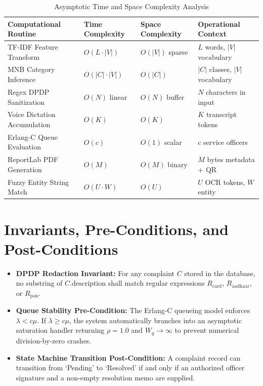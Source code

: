 \begin{table}[h]
\centering
\caption{Asymptotic Time and Space Complexity Analysis}
\label{tab:complexity_analysis}
\begin{tabular}{|p{4.5cm}|p{3.0cm}|p{3.0cm}|p{4.0cm}|}
\hline
\textbf{Computational Routine} & \textbf{Time Complexity} & \textbf{Space Complexity} & \textbf{Operational Context} \\ \hline
TF-IDF Feature Transform & $O(L \cdot |V|)$ & $O(|V|)$ sparse & $L$ words, $|V|$ vocabulary \\ \hline
MNB Category Inference & $O(|C| \cdot |V|)$ & $O(|C|)$ & $|C|$ classes, $|V|$ vocabulary \\ \hline
Regex DPDP Sanitization & $O(N)$ linear & $O(N)$ buffer & $N$ characters in input \\ \hline
Voice Dictation Accumulation & $O(K)$ & $O(K)$ & $K$ transcript tokens \\ \hline
Erlang-C Queue Evaluation & $O(c)$ & $O(1)$ scalar & $c$ service officers \\ \hline
ReportLab PDF Generation & $O(M)$ & $O(M)$ binary & $M$ bytes metadata + QR \\ \hline
Fuzzy Entity String Match & $O(U \cdot W)$ & $O(U)$ & $U$ OCR tokens, $W$ entity \\ \hline
\end{tabular}
\end{table}

\section{Invariants, Pre-Conditions, and Post-Conditions}
\begin{itemize}
    \item \textbf{DPDP Redaction Invariant:} For any complaint $C$ stored in the database, no substring of $C.\text{description}$ shall match regular expressions $R_{\text{card}}$, $R_{\text{aadhaar}}$, or $R_{\text{pan}}$.
    \item \textbf{Queue Stability Pre-Condition:} The Erlang-C queueing model enforces $\lambda < c\mu$. If $\lambda \ge c\mu$, the system automatically branches into an asymptotic saturation handler returning $\rho = 1.0$ and $W_q \rightarrow \infty$ to prevent numerical division-by-zero crashes.
    \item \textbf{State Machine Transition Post-Condition:} A complaint record can transition from `Pending' to `Resolved' if and only if an authorized officer signature and a non-empty resolution memo are supplied.
\end{itemize}
